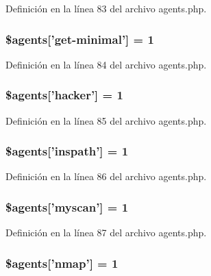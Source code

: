 Definición en la línea 83 del archivo agents.\-php.

\hypertarget{agents_8php_ab4a257059c1263f1c3226a86e954c5c2}{
\subsubsection[{\$agents}]{\setlength{\rightskip}{0pt plus 5cm}\$agents\mbox{[}'{\bf get}-\/minimal'\mbox{]} = 1}}\label{agents_8php_ab4a257059c1263f1c3226a86e954c5c2}


Definición en la línea 84 del archivo agents.\-php.

\hypertarget{agents_8php_a5fb0796a21129000bed87b4ced944fef}{
\subsubsection[{\$agents}]{\setlength{\rightskip}{0pt plus 5cm}\$agents\mbox{[}'hacker'\mbox{]} = 1}}\label{agents_8php_a5fb0796a21129000bed87b4ced944fef}


Definición en la línea 85 del archivo agents.\-php.

\hypertarget{agents_8php_a0c72a2087f83f48a88b49da898e11dcd}{
\subsubsection[{\$agents}]{\setlength{\rightskip}{0pt plus 5cm}\$agents\mbox{[}'inspath'\mbox{]} = 1}}\label{agents_8php_a0c72a2087f83f48a88b49da898e11dcd}


Definición en la línea 86 del archivo agents.\-php.

\hypertarget{agents_8php_ad0c709c6e691cf5a1dc87885d905a6b3}{
\subsubsection[{\$agents}]{\setlength{\rightskip}{0pt plus 5cm}\$agents\mbox{[}'myscan'\mbox{]} = 1}}\label{agents_8php_ad0c709c6e691cf5a1dc87885d905a6b3}


Definición en la línea 87 del archivo agents.\-php.

\hypertarget{agents_8php_a9ba59d72c6261e8255de0d19ea304c0f}{
\subsubsection[{\$agents}]{\setlength{\rightskip}{0pt plus 5cm}\$agents\mbox{[}'nmap'\mbox{]} = 1}}\label{agents_8php_a9ba59d72c6261e8255de0d19ea304c0f}


